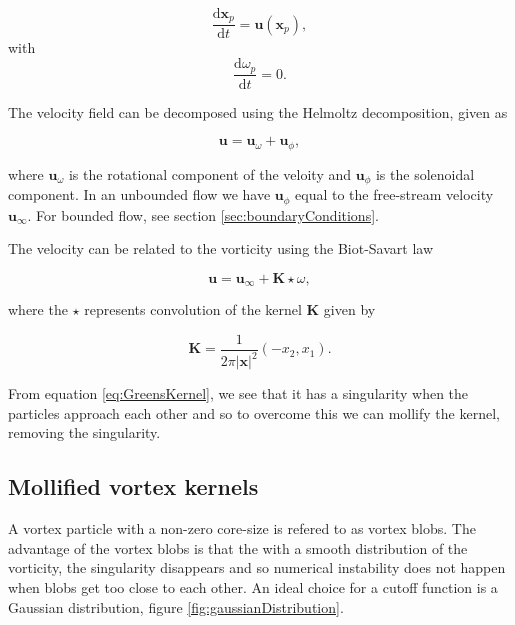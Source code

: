 	\begin{equation}
	\frac{\mathrm{d}\mathbf{x}_p}{\mathrm{d}t} = \mathbf{u}\left(\mathbf{x}_p\right),
	\end{equation}
with
	\begin{equation}
	\frac{\mathrm{d}\omega_p}{\mathrm{d}t} = 0.
	\end{equation}


The velocity field can be decomposed using the Helmoltz decomposition, given as

	\begin{equation}
	\mathbf{u} = \mathbf{u}_{\omega} + \mathbf{u}_{\phi},
	\end{equation}

where $\mathbf{u}_{\omega}$ is the rotational component of the veloity and $\mathbf{u}_{\phi}$ is the solenoidal component. In an unbounded flow we have $\mathbf{u}_{\phi}$ equal to the free-stream velocity $\mathbf{u}_{\infty}$. For bounded flow, see section \ref{sec:boundaryConditions}.
	
The velocity can be related to the vorticity using the Biot-Savart law

	\begin{equation}
	\mathbf{u} = \mathbf{u}_{\infty} + \mathbf{K}\star\omega,
	\end{equation}
	
where the $\star$ represents convolution of the kernel $\mathbf{K}$ given by

	\begin{equation}
	\mathbf{K} = \frac{1}{2\pi\left|\mathbf{x}\right|^2}\left(-x_2,x_1\right).
	\label{eq:GreensKernel}
	\end{equation}

From equation \ref{eq:GreensKernel}, we see that it has a singularity when the particles approach each other and so to overcome this we can mollify the kernel, removing the singularity.

\subsection{Mollified vortex kernels}

A vortex particle with a non-zero core-size is refered to as vortex blobs. The advantage of the vortex blobs is that the with a smooth distribution of the vorticity, the singularity disappears and so numerical instability does not happen when blobs get too close to each other. An ideal choice for a cutoff function is a Gaussian distribution, figure \ref{fig:gaussianDistribution}.

